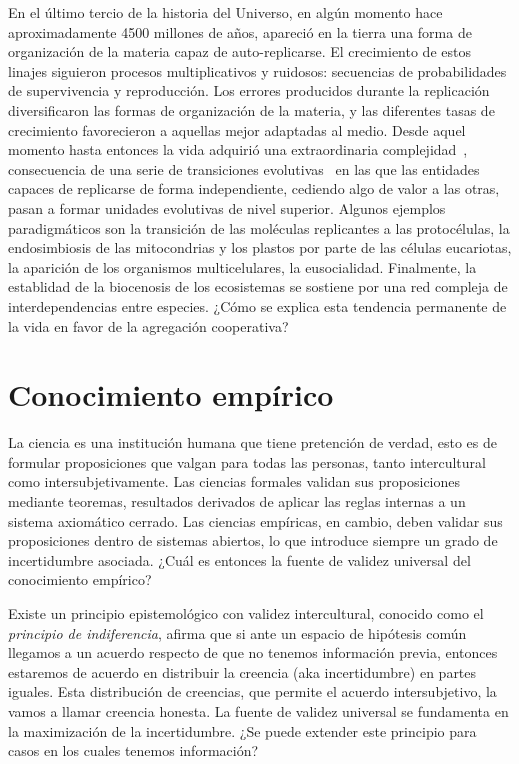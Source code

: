 \documentclass[a4paper,10pt]{article}
\begin{document}
En el último tercio de la historia del Universo, en algún momento hace aproximadamente 4500 millones de años, apareció en la tierra una forma de organización de la materia capaz de auto-replicarse.
El crecimiento de estos linajes siguieron procesos multiplicativos y ruidosos: secuencias de probabilidades de supervivencia y reproducción.
Los errores producidos durante la replicación diversificaron las formas de organización de la materia, y las diferentes tasas de crecimiento favorecieron a aquellas mejor adaptadas al medio.
Desde aquel momento hasta entonces la vida adquirió una extraordinaria complejidad~\cite{barOn2018-biomass}, consecuencia de una serie de transiciones evolutivas~\cite{maynardSmith1995-majorTransitions} en las que las entidades capaces de replicarse de forma independiente, cediendo algo de valor a las otras, pasan a formar unidades evolutivas de nivel superior.
Algunos ejemplos paradigmáticos son la transición de las moléculas replicantes a las protocélulas, la endosimbiosis de las mitocondrias y los plastos por parte de las células eucariotas, la aparición de los organismos multicelulares, la eusocialidad.
Finalmente, la establidad de la biocenosis de los ecosistemas se sostiene por una red compleja de interdependencias entre especies.
¿Cómo se explica esta tendencia permanente de la vida en favor de la agregación cooperativa?

\section{Conocimiento empírico}

La ciencia es una institución humana que tiene pretención de verdad, esto es de formular proposiciones que valgan para todas las personas, tanto intercultural como intersubjetivamente.
Las ciencias formales validan sus proposiciones mediante teoremas, resultados derivados de aplicar las reglas internas a un sistema axiomático cerrado.
Las ciencias empíricas, en cambio, deben validar sus proposiciones dentro de sistemas abiertos, lo que introduce siempre un grado de incertidumbre asociada.
¿Cuál es entonces la fuente de validez universal del conocimiento empírico?

Existe un principio epistemológico con validez intercultural, conocido como el \emph{principio de indiferencia}, afirma que si ante un espacio de hipótesis común llegamos a un acuerdo respecto de que no tenemos información previa, entonces estaremos de acuerdo en distribuir la creencia (aka incertidumbre) en partes iguales.
Esta distribución de creencias, que permite el acuerdo intersubjetivo, la vamos a llamar creencia honesta.
La fuente de validez universal se fundamenta en la maximización de la incertidumbre.
¿Se puede extender este principio para casos en los cuales tenemos información?
\end{document}
